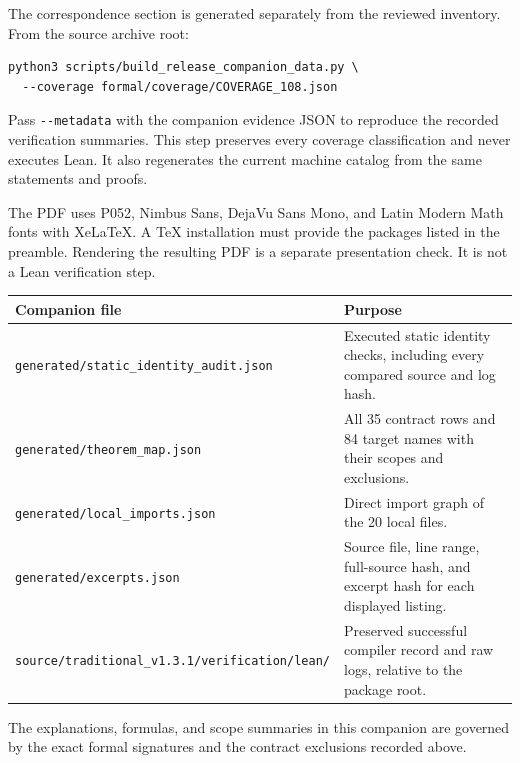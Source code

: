 \documentclass[11pt,a4paper]{article}
\newcommand{\code}[1]{\nolinkurl{#1}}
\begin{document}
The correspondence section is generated separately from the reviewed inventory. From the source archive root:
\begin{lstlisting}
python3 scripts/build_release_companion_data.py \
  --coverage formal/coverage/COVERAGE_108.json
\end{lstlisting}
Pass \code{--metadata} with the companion evidence JSON to reproduce the recorded verification summaries. This step preserves every coverage classification and never executes Lean. It also regenerates the current machine catalog from the same statements and proofs.

The PDF uses P052, Nimbus Sans, DejaVu Sans Mono, and Latin Modern Math fonts with XeLaTeX. A TeX installation must provide the packages listed in the preamble. Rendering the resulting PDF is a separate presentation check. It is not a Lean verification step.

\begin{longtable}{p{}p{}}
\toprule Companion file & Purpose \\\midrule\endhead
\code{generated/static_identity_audit.json} & Executed static identity checks, including every compared source and log hash. \\
\code{generated/theorem_map.json} & All 35 contract rows and 84 target names with their scopes and exclusions. \\
\code{generated/local_imports.json} & Direct import graph of the 20 local files. \\
\code{generated/excerpts.json} & Source file, line range, full-source hash, and excerpt hash for each displayed listing. \\
\code{source/traditional_v1.3.1/verification/lean/} & Preserved successful compiler record and raw logs, relative to the package root. \\
\bottomrule
\end{longtable}

The explanations, formulas, and scope summaries in this companion are governed by the exact formal signatures and the contract exclusions recorded above.
\end{document}

